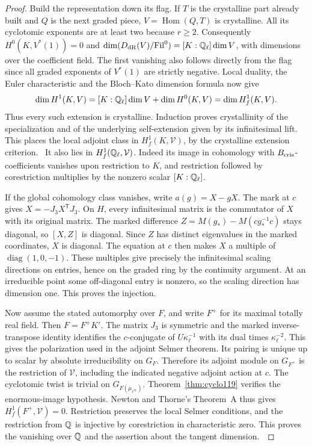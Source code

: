 \documentclass[a4paper,11pt]{article}
\theoremstyle{definition}
\theoremstyle{remark}
\numberwithin{equation}{section}
\begin{document}
\begin{proof}
Build the representation down its flag. If \(T\) is the
crystalline part already built and \(Q\) is the next graded
piece, \(V=\operatorname{Hom}(Q,T)\) is crystalline. All its
cyclotomic exponents are at least two because \(r\ge2\).
Consequently \(H^0(K,V^*(1))=0\) and
\(\dim(D_{\rm dR}(V)/\mathrm{Fil}^0)=[K:\mathbb Q_\ell]\dim V\),
with dimensions over the coefficient field. The first
vanishing also follows directly from the flag since all
graded exponents of \(V^*(1)\) are strictly negative. Local
duality, the Euler characteristic and the Bloch--Kato dimension
formula now give
\[
 \dim H^1(K,V)=[K:\mathbb Q_\ell]\dim V+\dim H^0(K,V)
              =\dim H_f^1(K,V).
\]
Thus every such extension is crystalline. Induction proves
crystallinity of the specialization and of the underlying
self-extension given by its infinitesimal lift. This places
the local adjoint class in \(H^1_f(K,\mathcal V)\), by the
crystalline extension criterion.~\cite{VI-IV-VI-bk117}
It also lies in \(H^1_f(\mathbb Q_\ell,\mathcal V)\). Indeed its
image in cohomology with \(B_{\rm cris}\)-coefficients
vanishes upon restriction to \(K\), and restriction followed
by corestriction multiplies by the nonzero scalar
\([K:\mathbb Q_\ell]\).

If the global cohomology class vanishes, write
\(a(g)=X-gX\). The mark at \(c\) gives \(X=-J_3X^{\mathsf T}J_3\).
On \(H\), every infinitesimal matrix is the commutator of
\(X\) with its original matrix. The marked difference
\(Z=M(g_*)-M(cg_*^{-1}c)\) stays diagonal, so \([X,Z]\)
is diagonal. Since \(Z\) has distinct eigenvalues in the
marked coordinates, \(X\) is diagonal. The equation at \(c\)
then makes \(X\) a multiple of \(\operatorname{diag}(1,0,-1)\).
These multiples give precisely the infinitesimal scaling
directions on entries, hence on the graded ring by the
continuity argument. At an irreducible point some off-diagonal
entry is nonzero, so the scaling direction has dimension one.
This proves the injection.

Now assume the stated automorphy over \(F\), and write \(F^+\)
for its maximal totally real field. Then \(F=F^+K'\). The
matrix \(J_3\) is symmetric and the marked inverse-transpose
identity identifies the \(c\)-conjugate of
\(U\kappa_\ell^{-1}\) with its dual times \(\kappa_\ell^{-2}\).
This gives the polarization used in the adjoint Selmer theorem.
Its pairing is unique up to scalar by absolute irreducibility
on \(G_F\). Therefore its adjoint module on \(G_{F^+}\) is
the restriction of \(\mathcal V\), including the indicated
negative adjoint action at \(c\). The cyclotomic twist is
trivial on \(G_{F(\mu_{\ell^\infty})}\). Theorem~\ref{thm:cyclo119}
verifies the enormous-image hypothesis. Newton and Thorne's
Theorem~A thus gives \(H^1_f(F^+,\mathcal V)=0\).
Restriction preserves the local Selmer conditions, and the
restriction from \(\mathbb Q\) is injective by corestriction in
characteristic zero. This proves the vanishing over
\(\mathbb Q\) and the assertion about the tangent dimension.~\cite{VI-IV-VI-nt119}
\end{proof}
\end{document}
